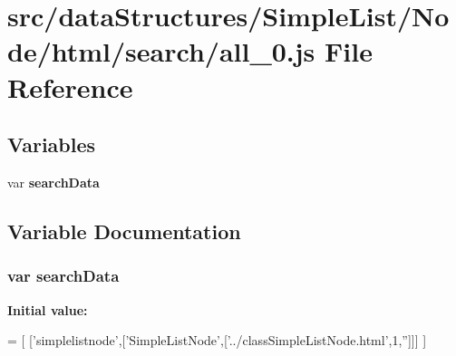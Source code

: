 \section{src/data\-Structures/\-Simple\-List/\-Node/html/search/all\-\_\-0.js File Reference}
\label{_simple_list_2_node_2html_2search_2all__0_8js}
\subsection*{Variables}
\begin{DoxyCompactItemize}
\item 
var {\bf search\-Data}
\end{DoxyCompactItemize}


\subsection{Variable Documentation}
\subsubsection[{search\-Data}]{\setlength{\rightskip}{0pt plus 5cm}var search\-Data}\label{_simple_list_2_node_2html_2search_2all__0_8js_ad01a7523f103d6242ef9b0451861231e}
{\bfseries Initial value\-:}
\begin{DoxyCode}
=
[
  [\textcolor{stringliteral}{'simplelistnode'},[\textcolor{stringliteral}{'SimpleListNode'},[\textcolor{stringliteral}{'../classSimpleListNode.html'},1,\textcolor{stringliteral}{''}]]]
]
\end{DoxyCode}
